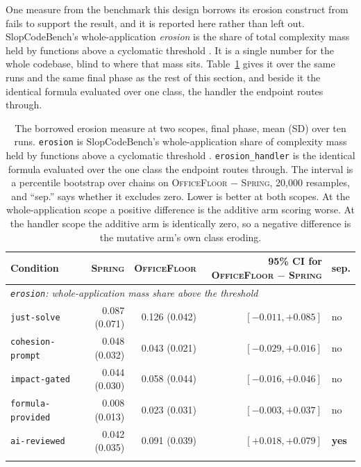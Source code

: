 \documentclass[11pt,a4paper]{article}
\newcommand{\sprg}{\textsc{Spring}}
\newcommand{\offl}{\textsc{OfficeFloor}}
\begin{document}
One measure from the benchmark this design borrows its erosion construct from
fails to support the result, and it is reported here rather than left out.
SlopCodeBench's whole-application \emph{erosion} is the share of total complexity
mass held by functions above a cyclomatic threshold \cite{slopcodebench}. It is a
single number for the whole codebase, blind to where that mass sits.
Table~\ref{tab:erosion} gives it over the same runs and the same final phase as
the rest of this section, and beside it the identical formula evaluated over one
class, the handler the endpoint routes through.

\begin{table}[t]
\centering
\caption{The borrowed erosion measure at two scopes, final phase, mean (SD) over
ten runs. \texttt{erosion} is SlopCodeBench's whole-application share of
complexity mass held by functions above a cyclomatic threshold
\cite{slopcodebench}. \texttt{erosion\_handler} is the identical formula
evaluated over the one class the endpoint routes through. The interval is a
percentile bootstrap over chains on \offl{} $-$ \sprg{}, 20{,}000 resamples, and
``sep.'' says whether it excludes zero. Lower is better at both scopes. At the
whole-application scope a positive difference is the additive arm scoring worse.
At the handler scope the additive arm is identically zero, so a negative
difference is the mutative arm's own class eroding.}
\label{tab:erosion}
\footnotesize
\setlength{\tabcolsep}{5pt}
\begin{tabular}{lrrrl}
\toprule
Condition & \sprg{} & \offl{} & 95\% CI for \offl{} $-$ \sprg{} & sep. \\
\midrule
\multicolumn{5}{l}{\emph{\texttt{erosion}: whole-application mass share above the threshold}}\\
\texttt{just-solve}       & 0.087 (0.071) & 0.126 (0.042) & $[-0.011, +0.085]$ & no \\
\texttt{cohesion-prompt}  & 0.048 (0.032) & 0.043 (0.021) & $[-0.029, +0.016]$ & no \\
\texttt{impact-gated}     & 0.044 (0.030) & 0.058 (0.044) & $[-0.016, +0.046]$ & no \\
\texttt{formula-provided} & 0.008 (0.013) & 0.023 (0.031) & $[-0.003, +0.037]$ & no \\
\texttt{ai-reviewed}      & 0.042 (0.035) & 0.091 (0.039) & $[+0.018, +0.079]$ & \textbf{yes} \\
\addlinespace
\multicolumn{5}{l}{\emph{\texttt{erosion\_handler}: the same formula over the entry-handler class}}\\

\end{tabular}
\end{table}
\end{document}
